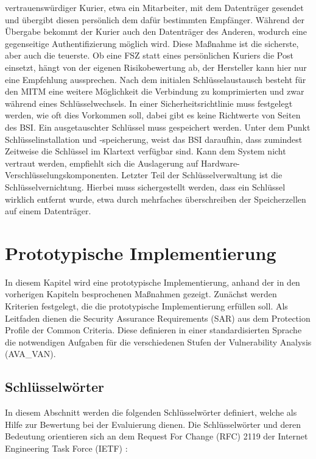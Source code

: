 \documentclass[11pt,a4paper]{report}
\begin{document}
vertrauenswürdiger Kurier, etwa ein Mitarbeiter, mit dem Datenträger gesendet und übergibt diesen persönlich dem dafür bestimmten Empfänger. Während der Übergabe bekommt der Kurier auch den Datenträger des Anderen, wodurch eine gegenseitige Authentifizierung möglich wird. Diese Maßnahme ist die sicherste, aber auch die teuerste. Ob eine FSZ statt eines persönlichen Kuriers die Post einsetzt, hängt von der eigenen Risikobewertung ab, der Hersteller kann hier nur eine Empfehlung aussprechen. Nach dem initialen Schlüsselaustausch besteht für den MITM eine weitere Möglichkeit die Verbindung zu komprimierten und zwar während eines Schlüsselwechsels. In einer Sicherheitsrichtlinie muss festgelegt werden, wie oft dies Vorkommen soll, dabei gibt es keine Richtwerte von Seiten des BSI. Ein ausgetauschter Schlüssel muss gespeichert werden. Unter dem Punkt Schlüsselinstallation und -speicherung, weist das BSI daraufhin, dass zumindest Zeitweise die Schlüssel im Klartext verfügbar sind. Kann dem System nicht vertraut werden, empfiehlt sich die Auslagerung auf Hardware-Verschlüsselungskomponenten. Letzter Teil der Schlüsselverwaltung ist die Schlüsselvernichtung. Hierbei muss sichergestellt werden, dass ein Schlüssel wirklich entfernt wurde, etwa durch mehrfaches überschreiben der Speicherzellen auf einem Datenträger.

\chapter{Prototypische Implementierung} \label{chap:implementation}

In diesem Kapitel wird eine prototypische Implementierung, anhand der in den vorherigen Kapiteln besprochenen Maßnahmen gezeigt. Zunächst werden Kriterien festgelegt, die die prototypische Implementierung erfüllen soll. Als Leitfaden dienen die Security Assurance Requirements (SAR) aus dem Protection Profile der Common Criteria. Diese definieren in einer standardisierten Sprache die notwendigen Aufgaben für die verschiedenen Stufen der Vulnerability Analysis (AVA\_VAN).

\section{Schlüsselwörter}

In diesem Abschnitt werden die folgenden Schlüsselwörter definiert, welche als Hilfe zur Bewertung bei der Evaluierung dienen. Die Schlüsselwörter und deren Bedeutung orientieren sich an dem Request For Change (RFC) 2119 der Internet Engineering Task Force (IETF) \cite{rfc_2119}:
\end{document}
